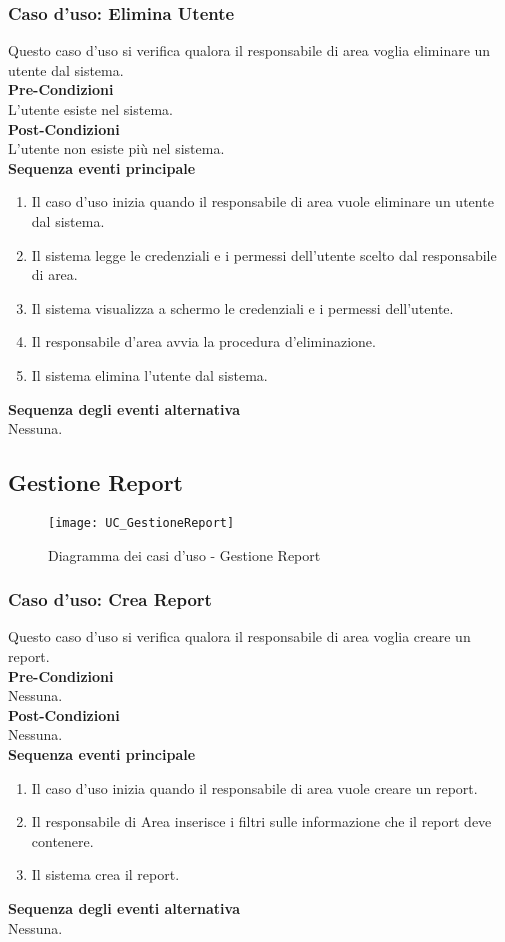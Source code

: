 \documentclass[green, fancy, 11pt]{elegantbook}
\begin{document}
\subsubsection{Caso d'uso: Elimina Utente}

Questo caso d’uso si verifica qualora il responsabile di area voglia eliminare un utente dal sistema.\\
\textbf{Pre-Condizioni}\\
L’utente esiste nel sistema.\\
\textbf{Post-Condizioni}\\
L’utente non esiste più nel sistema.\\
\textbf{Sequenza eventi principale}
\begin{enumerate}
	\item Il caso d’uso inizia quando il responsabile di area vuole eliminare un utente dal sistema.
	\item Il sistema legge le credenziali e i permessi dell’utente scelto dal responsabile di area.
	\item Il sistema visualizza a schermo le credenziali e i permessi dell’utente.
	\item Il responsabile d’area avvia la procedura d’eliminazione.
	\item Il sistema elimina l’utente dal sistema.
\end{enumerate}
\textbf{Sequenza degli eventi alternativa}\\
Nessuna.\\

\subsection{Gestione Report}
\begin{figure}[H]
	\centering
	\texttt{[image: UC\_GestioneReport]}
	\caption{Diagramma dei casi d'uso - Gestione Report}
\end{figure}

\subsubsection{Caso d’uso: Crea Report}

Questo caso d’uso si verifica qualora il responsabile di area voglia creare un report.\\
\textbf{Pre-Condizioni}\\
Nessuna.\\
\textbf{Post-Condizioni}\\
Nessuna.\\
\textbf{Sequenza eventi principale}
\begin{enumerate}
	\item Il caso d’uso inizia quando il responsabile di area vuole creare un report.
	\item Il responsabile di Area inserisce i filtri sulle informazione che il report deve contenere.
	\item Il sistema crea il report.
\end{enumerate}
\textbf{Sequenza degli eventi alternativa}\\
Nessuna.
\end{document}

